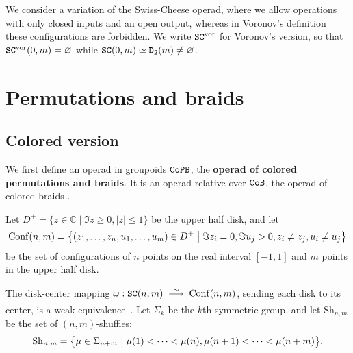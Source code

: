\begin{remark}
  \label{rmk.sc-sc-vor}
  We consider a variation of the Swiss-Cheese operad, where we allow operations with only closed inputs and an open output, whereas in Voronov's definition these configurations are forbidden.
  We write $\mathtt{SC}^{\mathrm{vor}}$  for Voronov's version, so that $\mathtt{SC}^{\mathrm{vor}}(0,m) = \varnothing$ while $\mathtt{SC}(0,m) \simeq \mathtt{D}_{2}(m) \neq \varnothing$.
\end{remark}

\section{Permutations and braids}
\label{sw.sec.perm-braid}

\subsection{Colored version}
\label{sw.sec.colored-version}

We first define an operad in groupoids $\mathtt{CoPB}$, the \textbf{operad of colored permutations and braids}.
It is an operad relative over $\mathtt{CoB}$, the operad of colored braids \cite[§I.5]{Fresse2017}.

Let $D^{+} = \{ z \in \mathbb{C} \mid \Im z \ge 0, |z| \leq 1 \}$ be the upper half disk, and let
\[ \operatorname{Conf}(n,m) = \bigl\{ (z_{1}, \dots, z_{n}, u_{1}, \dots, u_{m}) \in D^{+} \bigm| \Im z_{i} = 0, \Im u_{j} > 0, z_{i} \neq z_{j}, u_{i} \neq u_{j} \bigr\} \]
be the set of configurations of $n$ points on the real interval $[-1,1]$ and $m$ points in the upper half disk.

The disk-center mapping $\omega : \SC(n,m) \qiso \Conf(n,m)$, sending each disk to its center, is a weak equivalence~\cite{Voronov1999}.
Let $\Sigma_{k}$ be the $k$th symmetric group, and let $\mathrm{Sh}_{n,m}$ be the set of $(n,m)$-shuffles:
\[ \mathrm{Sh}_{n,m} = \bigl\{ \mu \in \Sigma_{n+m} \bigm| \mu(1) < \dots < \mu(n), \mu(n+1) < \dots < \mu(n+m) \bigr\}. \]


